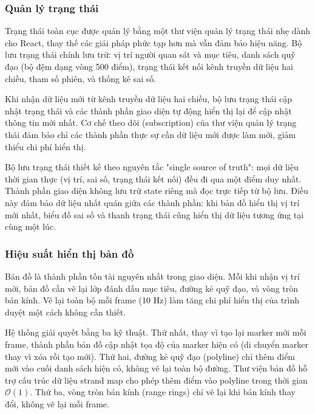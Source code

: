 \subsubsection{Quản lý trạng thái}

\hspace{0.5cm} Trạng thái toàn cục được quản lý bằng một thư viện quản lý trạng thái nhẹ dành cho React, thay thế các giải pháp phức tạp hơn mà vẫn đảm bảo hiệu năng. Bộ lưu trạng thái chính lưu trữ: vị trí người quan sát và mục tiêu, danh sách quỹ đạo (bộ đệm dạng vòng 500 điểm), trạng thái kết nối kênh truyền dữ liệu hai chiều, tham số phiên, và thống kê sai số.

Khi nhận dữ liệu mới từ kênh truyền dữ liệu hai chiều, bộ lưu trạng thái cập nhật trạng thái và các thành phần giao diện tự động hiển thị lại để cập nhật thông tin mới nhất. Cơ chế theo dõi (subscription) của thư viện quản lý trạng thái đảm bảo chỉ các thành phần thực sự cần dữ liệu mới được làm mới, giảm thiểu chi phí hiển thị.

Bộ lưu trạng thái thiết kế theo nguyên tắc "single source of truth": mọi dữ liệu thời gian thực (vị trí, sai số, trạng thái kết nối) đều đi qua một điểm duy nhất. Thành phần giao diện không lưu trữ state riêng mà đọc trực tiếp từ bộ lưu. Điều này đảm bảo dữ liệu nhất quán giữa các thành phần: khi bản đồ hiển thị vị trí mới nhất, biểu đồ sai số và thanh trạng thái cũng hiển thị dữ liệu tương ứng tại cùng một lúc.

\subsubsection{Hiệu suất hiển thị bản đồ}

\hspace{0.5cm} Bản đồ là thành phần tốn tài nguyên nhất trong giao diện. Mỗi khi nhận vị trí mới, bản đồ cần vẽ lại lớp đánh dấu mục tiêu, đường kẻ quỹ đạo, và vòng tròn bán kính. Vẽ lại toàn bộ mỗi frame (10 Hz) làm tăng chi phí hiển thị của trình duyệt một cách không cần thiết.

Hệ thống giải quyết bằng ba kỹ thuật. Thứ nhất, thay vì tạo lại marker mới mỗi frame, thành phần bản đồ cập nhật tọa độ của marker hiện có (di chuyển marker thay vì xóa rồi tạo mới). Thứ hai, đường kẻ quỹ đạo (polyline) chỉ thêm điểm mới vào cuối danh sách hiện có, không vẽ lại toàn bộ đường. Thư viện bản đồ hỗ trợ cấu trúc dữ liệu strand map cho phép thêm điểm vào polyline trong thời gian $\mathcal{O}(1)$. Thứ ba, vòng tròn bán kính (range rings) chỉ vẽ lại khi bán kính thay đổi, không vẽ lại mỗi frame.

